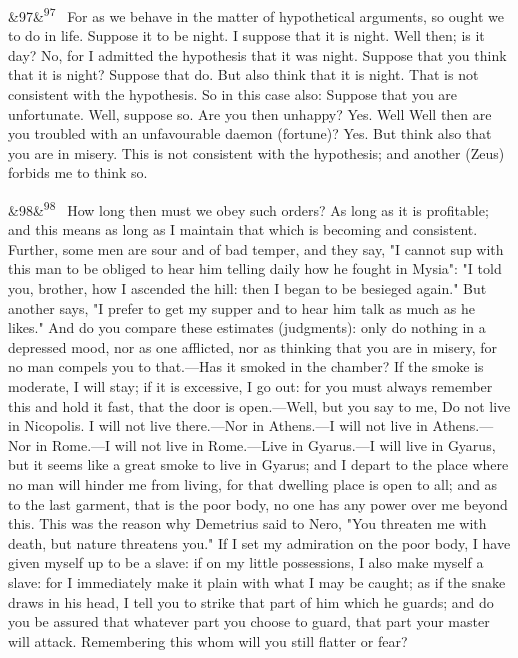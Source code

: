 \documentclass[12pt]{article}
\newcommand{\para}[1][]{\par\noindent\ifx&#1&\else\textsuperscript{\footnotesize #1}~\fi}
\begin{document}
\para[97] For as we behave in the matter of hypothetical arguments, so ought we to do in life. Suppose it to be night. I suppose that it is night. Well then; is it day? No, for I admitted the hypothesis that it was night. Suppose that you think that it is night? Suppose that do. But also think that it is night. That is not consistent with the hypothesis. So in this case also: Suppose that you are unfortunate. Well, suppose so. Are you then unhappy? Yes. Well Well then are you troubled with an unfavourable daemon (fortune)? Yes. But think also that you are in misery. This is not consistent with the hypothesis; and another (Zeus) forbids me to think so.

\para[98] How long then must we obey such orders? As long as it is profitable; and this means as long as I maintain that which is becoming and consistent. Further, some men are sour and of bad temper, and they say, "I cannot sup with this man to be obliged to hear him telling daily how he fought in Mysia": "I told you, brother, how I ascended the hill: then I began to be besieged again." But another says, "I prefer to get my supper and to hear him talk as much as he likes." And do you compare these estimates (judgments): only do nothing in a depressed mood, nor as one afflicted, nor as thinking that you are in misery, for no man compels you to that.—Has it smoked in the chamber? If the smoke is moderate, I will stay; if it is excessive, I go out: for you must always remember this and hold it fast, that the door is open.—Well, but you say to me, Do not live in Nicopolis. I will not live there.—Nor in Athens.—I will not live in Athens.—Nor in Rome.—I will not live in Rome.—Live in Gyarus.—I will live in Gyarus, but it seems like a great smoke to live in Gyarus; and I depart to the place where no man will hinder me from living, for that dwelling place is open to all; and as to the last garment, that is the poor body, no one has any power over me beyond this. This was the reason why Demetrius said to Nero, "You threaten me with death, but nature threatens you." If I set my admiration on the poor body, I have given myself up to be a slave: if on my little possessions, I also make myself a slave: for I immediately make it plain with what I may be caught; as if the snake draws in his head, I tell you to strike that part of him which he guards; and do you be assured that whatever part you choose to guard, that part your master will attack. Remembering this whom will you still flatter or fear?
\end{document}
